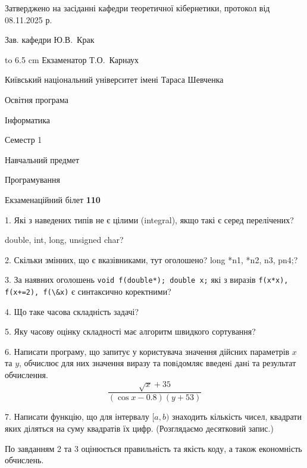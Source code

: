 \documentclass[12pt, ukrainian]{article}
\def\code#1{\Verb!#1!}
\begin{document}
{\smallskip\smallskip \begin {scriptsize} Затверджено на засіданні кафедри теоретичної кібернетики, протокол   від   08.11.2025 р.\par\smallskip\smallskip\smallskip\smallskip
{\parbox {6.5 cm} {Зав. кафедри \dotfill Ю.В.~Крак}}\hspace {0.7cm} {\hbox to 6.5 cm { Екзаменатор \dotfill Т.О.~Карнаух}} \end{scriptsize}}
\vspace{0.9cm}
{{\begin {scriptsize}\par
{ \center  Київський національний університет імені Тараса Шевченка \par}
{\parbox {5 cm}{Освітня програма \hfill}{\parbox {7 cm}{Інформатика\hfill}}\parbox {6 cm}{\hfill Семестр 1}}\par
{\parbox {5 cm} {Навчальний предмет \hfill}\parbox {7 cm}{Програмування \hfill}\parbox {6cm}{\hfill}\par}\vspace{-15pt} \end{scriptsize}}{\center Екзаменаційний білет \No \textbf { 110 }\par}}
{%
1. Які з наведених типів не є цілими (integral), якщо такі є серед перелічених?

double, int, long, unsigned char?
\par
\vspace{2mm}
2. Скільки змінних, що є вказівниками, тут оголошено?
long *n1, *n2, n3, pn4;?
\par
\vspace{2mm}
3. За наявних оголошень \code{void f(double*); double x;} які з виразів \code{f(x*x), f(x+=2), f(\&x)} є синтаксично коректними?
\par
\vspace{2mm}
4. Що таке часова складність задачі?
\par
\vspace{2mm}
5. Яку часову оцінку складності має алгоритм швидкого сортування?
\par
\vspace{2mm}
6. Написати програму, що запитує у користувача значення дійсних параметрів $x$ та $y$, обчислює для них значення виразу та повiдомляє введенi данi та результат обчислення.
$$\frac{\sqrt x + 35}{(\cos x - 0.8) (y + 53)}$$ 

\par
7. Написати функцію, що для інтервалу $[a, b)$ знаходить кількість чисел, квадрати яких діляться на суму квадратів їх цифр. (Розглядаємо десятковий запис.)

По завданням 2 та 3 оцінюється правильність та якість коду, а також економність обчислень.

}
\end{document}
